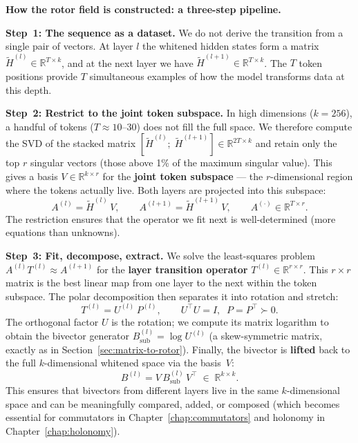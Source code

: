 \documentclass[11pt, twoside, openright]{memoir}
\numberwithin{equation}{chapter}
\begin{document}
\begin{mathbox}
\textbf{How the rotor field is constructed: a three-step pipeline.}

\textbf{Step~1: The sequence as a dataset.}
We do not derive the transition from a single pair of vectors.
At layer $l$ the whitened hidden states form a matrix
$\tilde{H}^{(l)} \in \mathbb{R}^{T \times k}$, and at the next layer
we have $\tilde{H}^{(l+1)} \in \mathbb{R}^{T \times k}$.  The $T$
token positions provide $T$ simultaneous examples of how the model
transforms data at this depth.

\textbf{Step~2: Restrict to the joint token subspace.}
In high dimensions ($k = 256$), a handful of tokens ($T \approx 10$--$30$)
does not fill the full space.  We therefore compute the SVD of the
stacked matrix $[\tilde{H}^{(l)};\; \tilde{H}^{(l+1)}] \in
\mathbb{R}^{2T \times k}$ and retain only the top $r$ singular vectors
(those above 1\% of the maximum singular value).  This gives a basis
$V \in \mathbb{R}^{k \times r}$ for the \textbf{joint token subspace}
--- the $r$-dimensional region where the tokens actually live.  Both
layers are projected into this subspace:
\begin{equation}
  A^{(l)} = \tilde{H}^{(l)}\, V, \qquad
  A^{(l+1)} = \tilde{H}^{(l+1)}\, V,
  \qquad A^{(\cdot)} \in \mathbb{R}^{T \times r}.
\end{equation}
The restriction ensures that the operator we fit next is well-determined
(more equations than unknowns).

\textbf{Step~3: Fit, decompose, extract.}
We solve the least-squares problem
$A^{(l)} T^{(l)} \approx A^{(l+1)}$
for the \textbf{layer transition operator} $T^{(l)} \in \mathbb{R}^{r \times r}$.
This $r \times r$ matrix is the best linear map from one layer to the next
within the token subspace.  The polar decomposition then separates it
into rotation and stretch:
\begin{equation}
\label{eq:polar}
  T^{(l)} = U^{(l)}\, P^{(l)},
  \qquad U^\top U = I,\;\; P = P^\top \succ 0.
\end{equation}
The orthogonal factor $U$ is the rotation; we compute its matrix
logarithm to obtain the bivector generator
$B^{(l)}_{\text{sub}} = \log U^{(l)}$ (a skew-symmetric matrix, exactly
as in Section~\ref{sec:matrix-to-rotor}).  Finally, the bivector is
\textbf{lifted} back to the full $k$-dimensional whitened space via the
basis~$V$:
\begin{equation}
  B^{(l)} = V\, B^{(l)}_{\text{sub}}\, V^\top
  \;\in\; \mathbb{R}^{k \times k}.
\end{equation}
This ensures that bivectors from different layers live in the same
$k$-dimensional space and can be meaningfully compared, added, or
composed (which becomes essential for commutators in
Chapter~\ref{chap:commutators} and holonomy in
Chapter~\ref{chap:holonomy}).


\end{mathbox}
\end{document}
